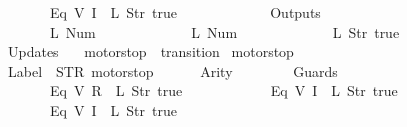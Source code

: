 \begin{isabellebody}
\ \ \ \ \ \ \ \ \ \ \ \ {\isacharparenleft}Eq\ {\isacharparenleft}V\ {\isacharparenleft}I\ {}{\isacharparenright}{\isacharparenright}\ {\isacharparenleft}L\ {\isacharparenleft}Str\ {\isacharprime}{\isacharprime}true{\isacharprime}{\isacharprime}{\isacharparenright}{\isacharparenright}{\isacharparenright}\isanewline
\ \ \ \ \ \ {\isacharbrackright}{\isacharcomma}\isanewline
\ \ \ \ \ \ Outputs\ {\isacharequal}\ {\isacharbrackleft}\isanewline
\ \ \ \ \ \ \ \ \ \ \ \ {\isacharparenleft}L\ {\isacharparenleft}Num\ {}{\isacharparenright}{\isacharparenright}{\isacharcomma}\isanewline
\ \ \ \ \ \ \ \ \ \ \ \ {\isacharparenleft}L\ {\isacharparenleft}Num\ {}{\isacharparenright}{\isacharparenright}{\isacharcomma}\isanewline
\ \ \ \ \ \ \ \ \ \ \ \ {\isacharparenleft}L\ {\isacharparenleft}Str\ {\isacharprime}{\isacharprime}true{\isacharprime}{\isacharprime}{\isacharparenright}{\isacharparenright}\isanewline
\ \ \ \ \ \ {\isacharbrackright}{\isacharcomma}\isanewline
\ \ \ \ \ \ Updates\ {\isacharequal}\ {\isacharbrackleft}{\isacharbrackright}\isanewline
{\isasymrparr}{\isachardoublequoteclose}\isanewline
\isanewline
{}\isamarkupfalse%
\ {\isachardoublequoteopen}motorstop{}{\isachardoublequoteclose}\ {\isacharcolon}{\isacharcolon}\ {\isachardoublequoteopen}transition{\isachardoublequoteclose}\ \isanewline
{\isachardoublequoteopen}motorstop{}\ {\isasymequiv}\ {\isasymlparr}\isanewline
\ \ \ \ \ \ Label\ {\isacharequal}\ STR\ {\isacharprime}{\isacharprime}motorstop{\isacharprime}{\isacharprime}{\isacharcomma}\isanewline
\ \ \ \ \ \ Arity\ {\isacharequal}\ {}{\isacharcomma}\isanewline
\ \ \ \ \ \ Guards\ {\isacharequal}\ {\isacharbrackleft}\isanewline
\ \ \ \ \ \ \ \ \ \ \ \ {\isacharparenleft}Eq\ {\isacharparenleft}V\ {\isacharparenleft}R\ {}{\isacharparenright}{\isacharparenright}\ {\isacharparenleft}L\ {\isacharparenleft}Str\ {\isacharprime}{\isacharprime}true{\isacharprime}{\isacharprime}{\isacharparenright}{\isacharparenright}{\isacharparenright}{\isacharcomma}\isanewline
\ \ \ \ \ \ \ \ \ \ \ \ {\isacharparenleft}Eq\ {\isacharparenleft}V\ {\isacharparenleft}I\ {}{\isacharparenright}{\isacharparenright}\ {\isacharparenleft}L\ {\isacharparenleft}Str\ {\isacharprime}{\isacharprime}true{\isacharprime}{\isacharprime}{\isacharparenright}{\isacharparenright}{\isacharparenright}{\isacharcomma}\isanewline
\ \ \ \ \ \ \ \ \ \ \ \ {\isacharparenleft}Eq\ {\isacharparenleft}V\ {\isacharparenleft}I\ {}{\isacharparenright}{\isacharparenright}\ {\isacharparenleft}L\ {\isacharparenleft}Str\ {\isacharprime}{\isacharprime}true{\isacharprime}{\isacharprime}{\isacharparenright}{\isacharparenright}{\isacharparenright}\isanewline

\end{isabellebody}
